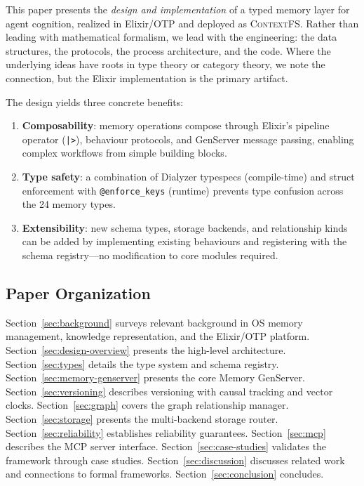 \documentclass[12pt,a4paper]{article}
\theoremstyle{definition}
\newcommand{\ContextFS}{\textsc{ContextFS}}
\begin{document}
This paper presents the \emph{design and implementation} of a typed memory layer for agent cognition, realized in Elixir/OTP and deployed as \ContextFS{}.
Rather than leading with mathematical formalism, we lead with the engineering: the data structures, the protocols, the process architecture, and the code.
Where the underlying ideas have roots in type theory or category theory, we note the connection, but the Elixir implementation is the primary artifact.

The design yields three concrete benefits:

\begin{enumerate}
  \item \textbf{Composability}: memory operations compose through Elixir's pipeline operator (\texttt{|>}), behaviour protocols, and GenServer message passing, enabling complex workflows from simple building blocks.
  \item \textbf{Type safety}: a combination of Dialyzer typespecs (compile-time) and struct enforcement with \texttt{@enforce\_keys} (runtime) prevents type confusion across the 24 memory types.
  \item \textbf{Extensibility}: new schema types, storage backends, and relationship kinds can be added by implementing existing behaviours and registering with the schema registry---no modification to core modules required.
\end{enumerate}

\subsection{Paper Organization}

Section~\ref{sec:background} surveys relevant background in OS memory management, knowledge representation, and the Elixir/OTP platform.
Section~\ref{sec:design-overview} presents the high-level architecture.
Section~\ref{sec:types} details the type system and schema registry.
Section~\ref{sec:memory-genserver} presents the core Memory GenServer.
Section~\ref{sec:versioning} describes versioning with causal tracking and vector clocks.
Section~\ref{sec:graph} covers the graph relationship manager.
Section~\ref{sec:storage} presents the multi-backend storage router.
Section~\ref{sec:reliability} establishes reliability guarantees.
Section~\ref{sec:mcp} describes the MCP server interface.
Section~\ref{sec:case-studies} validates the framework through case studies.
Section~\ref{sec:discussion} discusses related work and connections to formal frameworks.
Section~\ref{sec:conclusion} concludes.
\end{document}

